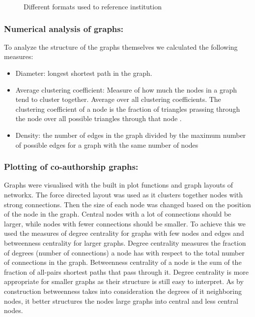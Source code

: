 \documentclass[article,twocolumn]{IEEEtran}
\providecommand{\tightlist}{%
      \setlength{\itemsep}{0pt}\setlength{\parskip}{0pt}}
\begin{document}
    \begin{figure}
        \begin{center}\end{center}
        \caption{Different formats used to reference institution}
        \label{unigraph}
    \end{figure}
    
    \hypertarget{numerical-analysis-of-graphs}{%
\subsubsection{Numerical analysis of
graphs:}\label{numerical-analysis-of-graphs}}

To analyze the structure of the graphs themselves we calculated the
following measures:

\begin{itemize}
\tightlist
\item
  Diameter: longest shortest path in the graph.
\item
  Average clustering coefficient: Measure of how much the nodes in a
  graph tend to cluster together. Average over all clustering
  coefficients. The clustering coefficient of a node is the fraction of
  triangles prassing through the node over all possible triangles
  through that node \cite{watts1998collective}.
\item
  Density: the number of edges in the graph divided by the maximum
  number of possible edges for a graph with the same number of nodes
\end{itemize}

    \hypertarget{plotting-of-co-authorship-graphs}{%
\subsubsection{Plotting of co-authorship
graphs:}\label{plotting-of-co-authorship-graphs}}

Graphs were visualised with the built in plot functions and graph
layouts of networkx. The force directed layout was used as it clusters
together nodes with strong connections. Then the size of each node was
changed based on the position of the node in the graph. Central nodes
with a lot of connections should be larger, while nodes with fewer
connections should be smaller. To achieve this we used the measures of
degree centrality for graphs with few nodes and edges and betweenness
centrality for larger graphs. Degree centrality measures the fraction of
degrees (number of connections) a node has with respect to the total
number of connections in the graph. Betweenness centrality of a node is
the sum of the fraction of all-pairs shortest paths that pass through
it. Degree centrality is more appropriate for smaller graphs as their
structure is still easy to interpret. As by construction betweenness
takes into consideration the degrees of it neighboring nodes, it better
structures the nodes large graphs into central and less central nodes.
\end{document}
